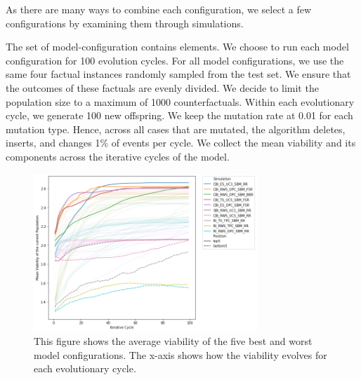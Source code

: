 \documentclass[./../../paper.tex]{subfiles}
\begin{document}
\label{sec:exp1}
As there are many ways to combine each configuration, we select a few configurations by examining them through simulations.  



The set of model-configuration contains \NumEvoCombinations elements. 
We choose to run each model configuration for 100 evolution cycles. 
For all model configurations, we use the same four factual \glspl{instance} randomly sampled from the test set. We ensure that the outcomes of these factuals are evenly divided. 
We decide to limit the population size to a maximum of 1000 counterfactuals. Within each evolutionary cycle, we generate 100 new offspring. We keep the mutation rate at 0.01 for each mutation type. Hence, across all cases that are mutated, the algorithm deletes, inserts, and changes 1\% of events per cycle. We collect the mean viability and its components across the iterative cycles of the model.



\begin{figure}[htbp]
    \centering
    \includegraphics[width=0.75\textwidth]{figures/generated/exp1_effect_on_viability_top10_last10.png}
    \caption{This figure shows the average viability of the five best and worst model configurations. The x-axis shows how the viability evolves for each evolutionary cycle.}
    \label{fig:average-viability}
\end{figure}
\end{document}
